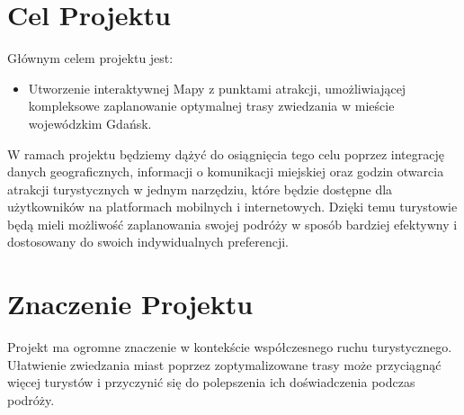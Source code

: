 \documentclass{report}
\begin{document}
	\begin{center}
	\end{center}

	\section{Cel Projektu}

	Głównym celem projektu jest:

	\begin{itemize}
		\item Utworzenie interaktywnej Mapy z punktami atrakcji, umożliwiającej kompleksowe zaplanowanie optymalnej trasy zwiedzania w mieście wojewódzkim Gdańsk.
	\end{itemize}

	W ramach projektu będziemy dążyć do osiągnięcia tego celu poprzez integrację danych geograficznych, informacji o komunikacji miejskiej oraz godzin otwarcia atrakcji turystycznych w jednym narzędziu, które będzie dostępne dla użytkowników na platformach mobilnych i internetowych. Dzięki temu turystowie będą mieli możliwość zaplanowania swojej podróży w sposób bardziej efektywny i dostosowany do swoich indywidualnych preferencji.

	\section{Znaczenie Projektu}

	Projekt ma ogromne znaczenie w kontekście współczesnego ruchu turystycznego. Ułatwienie zwiedzania miast poprzez zoptymalizowane trasy może przyciągnąć więcej turystów i przyczynić się do polepszenia ich doświadczenia podczas podróży.
\end{document}

